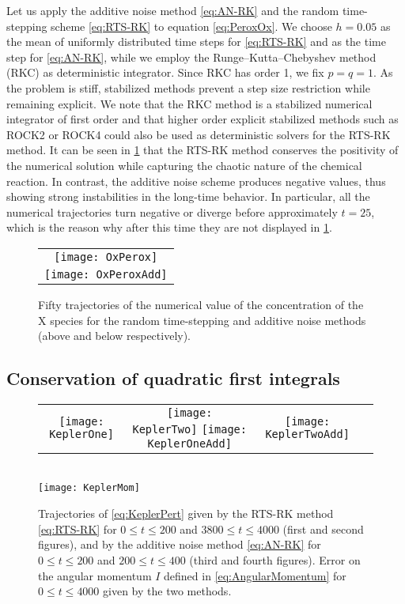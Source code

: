 \documentclass[10pt]{article}
\begin{document}
Let us apply the additive noise method \eqref{eq:AN-RK} and the random time-stepping scheme \eqref{eq:RTS-RK} to equation \eqref{eq:PeroxOx}. We choose $h = 0.05$ as the mean of uniformly distributed time steps for \eqref{eq:RTS-RK} and as the time step for \eqref{eq:AN-RK}, while we employ the Runge--Kutta--Chebyshev method (RKC) \cite{HoS80} as deterministic integrator. Since RKC has order 1, we fix $p = q = 1$. As the problem is stiff, stabilized methods prevent a step size restriction while remaining explicit. We note that the RKC method is a stabilized numerical integrator of first order and that higher order explicit stabilized methods such as ROCK2 or ROCK4 \cite{AbM01, Abd02} could also be used as deterministic solvers for the RTS-RK method. It can be seen in \cref{fig:OxPeroxTraj} that the RTS-RK method conserves the positivity of the numerical solution while capturing the chaotic nature of the chemical reaction. In contrast, the additive noise scheme produces negative values, thus showing strong instabilities in the long-time behavior. In particular, all the numerical trajectories turn negative or diverge before approximately $t = 25$, which is the reason why after this time they are not displayed in \cref{fig:OxPeroxTraj}.
\begin{figure}
	\begin{center} 
		\begin{tabular}{c}
			\texttt{[image: OxPerox]}\\[10pt]
			\texttt{[image: OxPeroxAdd]}
		\end{tabular}
	\end{center}
	\caption{Fifty trajectories of the numerical value of the concentration of the $\mathrm X$ species for the random time-stepping and additive noise methods (above and below respectively).}
	\label{fig:OxPeroxTraj}
\end{figure}

\subsection{Conservation of quadratic first integrals} 

\begin{figure}[t]
	\begin{center}
		\begin{tabular}{cccc}
			\texttt{[image: KeplerOne]} & \texttt{[image: KeplerTwo]} \texttt{[image: KeplerOneAdd]} & \texttt{[image: KeplerTwoAdd]} \\
		\end{tabular}\\
	\vspace{0.4cm}
	\texttt{[image: KeplerMom]}
	\end{center}
	\caption{Trajectories of \eqref{eq:KeplerPert} given by the RTS-RK method \eqref{eq:RTS-RK} for $0 \leq t \leq 200$ and $3800 \leq t \leq 4000$ (first and second figures), and by the additive noise method \eqref{eq:AN-RK} for $0 \leq t \leq 200$ and $200 \leq t \leq 400$ (third and fourth figures). Error on the angular momentum $I$ defined in \eqref{eq:AngularMomentum} for $0 \leq t \leq 4000$ given by the two methods.}
	\label{fig:Kepler}
\end{figure}
\end{document}
